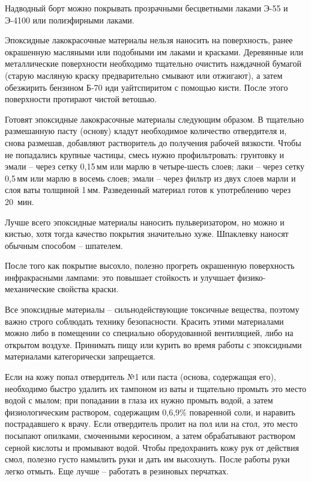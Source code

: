 \documentclass[a4paper, 12pt, twoside, final]{scrbook}
\begin{document}
Надводный борт можно покрывать прозрачными бесцветными лаками Э-55 и Э-4100 или полиэфирными лаками. 

Эпоксидные лакокрасочные материалы нельзя наносить на поверхность, ранее окрашенную масляными или подобными им лаками и красками. Деревянные или металлические поверхности необходимо тщательно очистить наждачной бумагой (старую масляную краску предварительно смывают или отжигают), а затем обезжирить бензином Б-70 иди уайтспиритом с помощью кисти. После этого поверхности протирают чистой ветошью.

Готовят эпоксидные лакокрасочные материалы следующим образом. В тщательно размешанную пасту (основу) кладут необходимое количество отвердителя и, снова размешав, добавляют растворитель до получения рабочей вязкости. Чтобы не попадались крупные частицы, смесь нужно профильтровать: грунтовку и эмали \--- через сетку 0,15\,мм или марлю в четыре\--шесть слоев; лаки \--- через сетку 0,5\,мм или марлю в восемь слоев; эмали \--- через фильтр из двух слоев марли и слоя ваты толщиной 1\,мм. Разведенный материал готов к употреблению через 20~мин.

Лучше всего эпоксидные материалы наносить пульверизатором, но можно и кистью, хотя тогда качество покрытия значительно хуже. Шпаклевку наносят обычным способом \--- шпателем.

После того как покрытие высохло, полезно прогреть окрашенную поверхность инфракрасными лампами: это повышает стойкость и улучшает физико-механические свойства краски.

Все эпоксидные материалы \--- сильнодействующие токсичные вещества, поэтому важно строго соблюдать технику безопасности. Красить этими материалами можно либо в помещении со специально оборудованной вентиляцией, либо на открытом воздухе. Принимать пищу или курить во время работы с эпоксидными материалами категорически запрещается.

Если на кожу попал отвердитель №1 или паста (основа, содержащая его), необходимо быстро удалить их тампоном из ваты и тщательно промыть это место водой с мылом; при попадании в глаза их нужно промыть водой, а затем физиологическим раствором, содержащим 0,6,9\% поваренной соли, и наравить пострадавшего к врачу. Если отвердитель пролит на пол или на стол, это место посыпают опилками, смоченными керосином, а затем обрабатывают раствором серной кислоты и промывают водой. Чтобы предохранить кожу рук от действия смол, полезно густо намылить руки и дать им высохнуть. После работы руки легко отмыть. Еще лучше \--- работать в резиновых перчатках.
\end{document}
